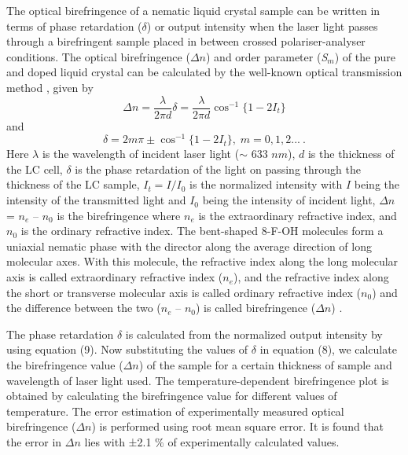 \documentclass[reprint,amsfonts,amsmath,amssymb,aps,pre,floatfix,10pt]{revtex4-1}
\begin{document}
The optical birefringence of a nematic liquid crystal sample can be written in terms of phase retardation ($\delta$) or output intensity when the laser light passes through a birefringent sample placed in between crossed polariser-analyser conditions. The optical birefringence ($\Delta n$) and order parameter (\emph{S$_{m}$}) of the pure and doped liquid crystal can be calculated by the well-known optical transmission method \cite{dierking2003textures_56}, given by
\begin{equation}
\label{Birefringence}
\Delta n = \frac{\lambda}{2\pi d}\delta %
= \frac{\lambda}{2\pi d}\cos ^{-1}\big\{1-2I_{t}\big\}
\end{equation}
and
\begin{equation}
\label{Phase retardation}
\delta = 2m\pi \pm \cos ^{-1}\big\{1-2I_{t}\big\},\;  m = 0, 1, 2... \ .
\end{equation}
Here $\lambda$ is the wavelength of incident laser light ($\sim$ 633  $nm$), $d$ is the thickness of the LC cell, $\delta$ is the phase retardation of the light on passing through the thickness of the LC sample, $I_{t} = I / I_0$ is the normalized intensity with $I$ being the intensity of the transmitted light and $I_{0}$ being the intensity of incident light, $\Delta n$ = $n_{e}$ – $n_{0}$ is the birefringence where $n_{e}$ is the extraordinary refractive index, and $n_{0}$ is the ordinary refractive index. The bent-shaped 8-F-OH molecules form a uniaxial nematic phase with the director along the average direction of long molecular axes. With this molecule, the refractive index along the long molecular axis is called extraordinary refractive index ($n_{e}$), and the refractive index along the short or transverse molecular axis is called ordinary refractive index ($n_{0}$) and the difference between the two ($n_{e}$ – $n_{0}$) is called birefringence ($\Delta n$) \cite{dierking2003textures_56}.

The phase retardation $\delta$ is calculated from the normalized output intensity by using equation (9). Now substituting the values of $\delta$ in equation (8), we calculate the birefringence value ($\Delta n$) of the sample for a certain thickness of sample and wavelength of laser light used. The temperature-dependent birefringence plot is obtained by calculating the birefringence value for different values of temperature. The error estimation of experimentally measured optical birefringence ($\Delta n$) is performed using root mean square error. It is found that the error in $\Delta n$ lies with ±2.1 $\%$ of experimentally calculated values.
\end{document}
